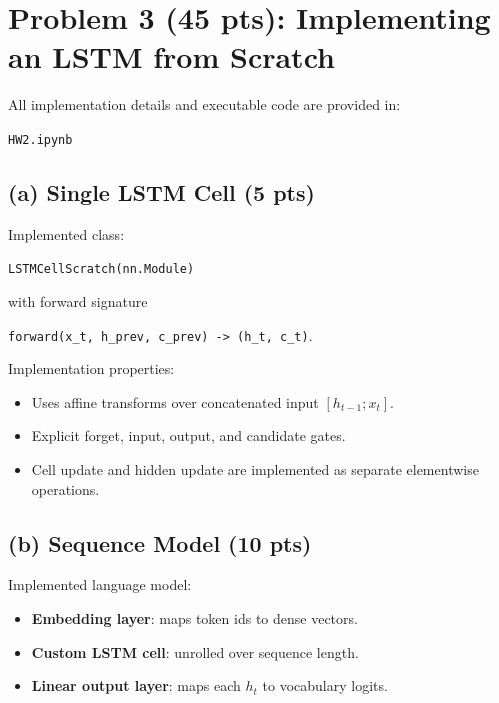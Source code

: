 \documentclass[11pt]{article}
\begin{document}
\section*{Problem 3 (45 pts): Implementing an LSTM from Scratch}

All implementation details and executable code are provided in:
\begin{center}
\texttt{HW2.ipynb}
\end{center}

\subsection*{(a) Single LSTM Cell (5 pts)}

Implemented class:
\begin{center}
\texttt{LSTMCellScratch(nn.Module)}
\end{center}
with forward signature
\begin{center}
\texttt{forward(x\_t, h\_prev, c\_prev) -> (h\_t, c\_t)}.
\end{center}

Implementation properties:
\begin{itemize}[nosep]
    \item Uses affine transforms over concatenated input $[h_{t-1};x_t]$.
    \item Explicit forget, input, output, and candidate gates.
    \item Cell update and hidden update are implemented as separate elementwise operations.
\end{itemize}

\subsection*{(b) Sequence Model (10 pts)}

Implemented language model:
\begin{itemize}[nosep]
    \item \textbf{Embedding layer}: maps token ids to dense vectors.
    \item \textbf{Custom LSTM cell}: unrolled over sequence length.
    \item \textbf{Linear output layer}: maps each $h_t$ to vocabulary logits.
\end{itemize}
\end{document}
